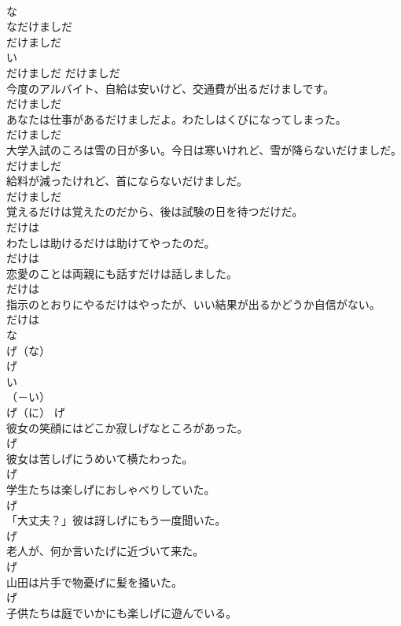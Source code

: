 \documentclass[8pt]{extreport}
\begin{document}
\begin{CJK}{UTF8}{min}
\\	な
\\	なだけましだ	
\\	だけましだ	
\\	い
\\	だけましだ	だけましだ	
\\	今度のアルバイト、自給は安いけど、交通費が出るだけましです。	
\\	だけましだ	
\\	あなたは仕事があるだけましだよ。わたしはくびになってしまった。	
\\	だけましだ	
\\	大学入試のころは雪の日が多い。今日は寒いけれど、雪が降らないだけましだ。	
\\	だけましだ	
\\	給料が減ったけれど、首にならないだけましだ。	
\\	だけましだ	
\\	覚えるだけは覚えたのだから、後は試験の日を待つだけだ。	
\\	だけは	
\\	わたしは助けるだけは助けてやったのだ。	
\\	だけは	
\\	恋愛のことは両親にも話すだけは話しました。	
\\	だけは	
\\	指示のとおりにやるだけはやったが、いい結果が出るかどうか自信がない。	
\\	だけは	
\\	な
\\	げ（な）	
\\	げ	
\\	い
\\	（－い） 
\\	げ（に）	げ	
\\	彼女の笑顔にはどこか寂しげなところがあった。	
\\	げ	
\\	彼女は苦しげにうめいて横たわった。	
\\	げ	
\\	学生たちは楽しげにおしゃべりしていた。	
\\	げ	
\\	「大丈夫？」彼は訝しげにもう一度聞いた。	
\\	げ	
\\	老人が、何か言いたげに近づいて来た。	
\\	げ	
\\	山田は片手で物憂げに髪を掻いた。	
\\	げ	
\\	子供たちは庭でいかにも楽しげに遊んでいる。	

\end{CJK}
\end{document}
